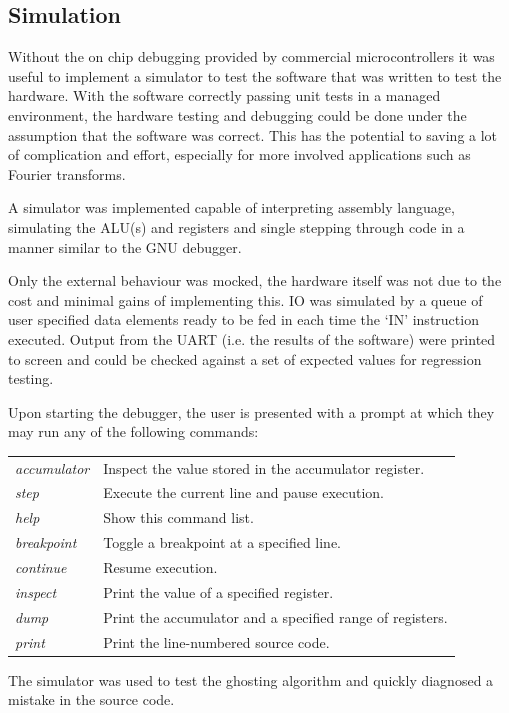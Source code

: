 \subsection{Simulation}
 Without the on chip debugging provided by commercial microcontrollers it was
 useful to implement a simulator to test the software that was written to test
 the hardware. With the software correctly passing unit tests in a managed
 environment, the hardware testing and debugging could be done under the
 assumption that the software was correct. This has the potential to saving a lot
 of complication and effort, especially for more involved applications such as
 Fourier transforms.

 A simulator was implemented capable of interpreting assembly language,
 simulating the ALU(s) and registers and single stepping through code in a
 manner similar to the GNU debugger.

 Only the external behaviour was mocked, the hardware itself was not due to the
 cost and minimal gains of implementing this. IO was simulated by a queue of
 user specified data elements ready to be fed in each time the `IN' instruction
 executed. Output from the UART (i.e. the results of the software) were printed to
 screen and could be checked against a set of expected values for regression
 testing.

 Upon starting the debugger, the user is presented with a prompt at which they
 may run any of the following commands:

 \vspace{5pt}
 \begin{tabularx}{\linewidth}{lX}
    \hline
    \emph{accumulator} & Inspect the value stored in the accumulator register.  \\
    \emph{step} & Execute the current line and pause execution. \\
    \emph{help} & Show this command list. \\
    \emph{breakpoint} & Toggle a breakpoint at a specified line. \\
    \emph{continue} & Resume execution. \\
    \emph{inspect} & Print the value of a specified register. \\
    \emph{dump} & Print the accumulator and a specified range of registers. \\
    \emph{print} & Print the line-numbered source code. \\
    \hline
 \end{tabularx}
 \vspace{5pt}

 The simulator was used to test the ghosting algorithm and quickly diagnosed a
 mistake in the source code.
